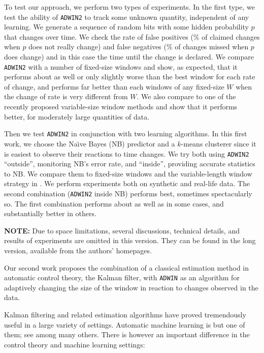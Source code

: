 To test our approach, we perform two types of experiments.
In the first type, we test the ability of {\tt ADWIN2}
to track some unknown quantity, independent of any learning.
We generate a sequence of random bits with some hidden
probability $p$ that changes over time. We check the rate
of false positives (\% of claimed changes when $p$ does not
really change) and false negatives (\% of changes missed
when $p$ does change) and in this case the time until
the change is declared. We compare {\tt ADWIN2} with
a number of fixed-size windows and show, as expected,
that it performs about as well or only slightly worse than the best
window for each rate of change, and performs far better than
each windows of any fixed-size $W$ when the change of rate is
very different from $W$. We also compare
to one of the recently proposed variable-size window methods \cite{Gama}
and show that it performs better, for moderately large quantities of data.

Then we test {\tt ADWIN2} in conjunction with two %
learning algorithms.
In this first work, we choose the Na\"\i ve Bayes (NB) predictor  and a $k$-means clusterer since
it is easiest to observe their reactions %
 to time changes. %
We try both using {\tt ADWIN2} ``outside'', monitoring NB's
error rate, and ``inside'', providing accurate statistics to NB.
We compare them to fixed-size windows and the 
 variable-length window strategy in \cite{Gama}.
We perform experiments both on synthetic and real-life data.
The second combination ({\tt ADWIN2} inside NB) performs best, sometimes
spectacularly so. The first combination performs about as well
as \cite{Gama} in some cases, and substantially better in others.

\BEGINOMIT
{\bf NOTE:} Due to space limitations, several discussions,
technical details, and results of experiments are omitted in this 
version. They can be found in the long version, available from the authors'
homepages.
\ENDOMIT

Our second work \cite{Kbif-gav} proposes the combination of a classical estimation method
in automatic control theory, the Kalman filter, with 
{\tt ADWIN} as an algorithm for adaptively changing the size of the window in reaction to changes observed in the data. 

Kalman filtering and related estimation algorithms
have proved tremendously useful in a large variety of settings. 
Automatic machine learning is but one of them; 
see  \cite{gama-apneas,jacob-04} among many others. 
There is however an important difference in the 
control theory and machine learning settings: 

